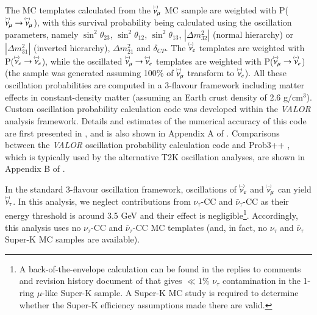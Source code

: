 The MC templates calculated from the
$\accentset{(-)}{\nu}_{\mu}$ MC sample are weighted 
with P($\accentset{(-)}{\nu}_{\mu} \rightarrow \accentset{(-)}{\nu}_{\mu}$), with this survival probability being calculated using the 
oscillation parameters, namely $\sin^{2} \theta_{23}$, $\sin^{2} \theta_{12}$, $\sin^{2} \theta_{13}$, 
$|\Delta m^{2}_{32}|$ (normal hierarchy) or $|\Delta m^{2}_{31}|$ (inverted hierarchy), 
$\Delta m^{2}_{21}$ and $\delta_{CP}$. The $\accentset{(-)}{\nu}_{e}$ templates are weighted with P($\accentset{(-)}{\nu}_{e} \rightarrow \accentset{(-)}{\nu}_{e}$), 
while the oscillated $\accentset{(-)}{\nu}_{\mu} \rightarrow \accentset{(-)}{\nu}_{e}$ templates are weighted with P($\accentset{(-)}{\nu}_{\mu} \rightarrow \accentset{(-)}{\nu}_{e}$) 
(the sample was generated assuming 100\% of $\accentset{(-)}{\nu}_{\mu}$ transform to $\accentset{(-)}{\nu}_{e}$). 
All these oscillation probabilities are computed in a 3-flavour framework including matter effects in constant-density matter
(assuming an Earth crust density of 2.6 g/cm$^{3}$).
Custom oscillation probability calculation code was developed within the {\em VALOR} analysis framework.
Details and estimates of the numerical accuracy of this code are first presented in \cite{OurRun12DisappAnalysis3Flavour},
and is also shown in Appendix A of \cite{OurRun123DisappAnalysis3Flavour}.
Comparisons between the {\em VALOR} oscillation probability calculation code and Prob3++ \cite{Prob3}, 
which is typically used by the alternative T2K oscillation analyses, are shown in Appendix B of \cite{OurRun123DisappAnalysis3Flavour}.

In the standard 3-flavour oscillation framework,
oscillations of $\accentset{(-)}{\nu}_{e}$ and $\accentset{(-)}{\nu}_{\mu}$ can yield $\accentset{(-)}{\nu}_{\tau}$.
In this analysis, we neglect contributions from $\nu_{\tau}$-CC and $\bar{\nu}_{\tau}$-CC as their
energy threshold is around 3.5 GeV and their effect is negligible\footnote{
A back-of-the-envelope calculation can be found in the replies to
comments and revision history document of
\cite{OurRun123DisappAnalysis3Flavour} that gives $\ll 1\%$ $\nu_\tau$
contamination in the 1-ring $\mu$-like Super-K sample. A Super-K MC study is required
to determine whether the Super-K efficiency assumptions made there are valid.
  }.
Accordingly, this analysis uses no $\nu_{\tau}$-CC and $\bar{\nu}_{\tau}$-CC MC templates
(and, in fact, no $\nu_{\tau}$ and $\bar{\nu}_{\tau}$ Super-K MC samples are available).

